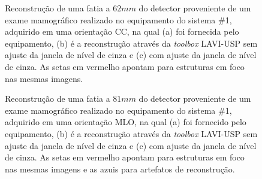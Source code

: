 \begin{figure}[!ht]
	\centering	
	\caption{Reconstrução de uma fatia a $62mm$ do detector proveniente de um exame mamográfico realizado no equipamento do sistema \#1, adquirido em uma orientação \acs{CC}, na qual (a) foi fornecida pelo equipamento, (b) é a reconstrução através da \textit{toolbox} LAVI-USP sem ajuste da janela de nível de cinza e (c) com ajuste da janela de nível de cinza. As setas em vermelho apontam para estruturas em foco nas mesmas imagens. }
	
	
	
	\hfil
	\label{fig:imgCap6ClinicalGECC}
\end{figure}

\clearpage

\begin{figure}[!ht]
	\centering	
	\caption{Reconstrução de uma fatia a $81mm$ do detector proveniente de um exame mamográfico realizado no equipamento do sistema \#1, adquirido em uma orientação \acs{MLO}, na qual (a) foi fornecido pelo equipamento, (b) é a reconstrução através da \textit{toolbox} LAVI-USP sem ajuste da janela de nível de cinza e (c) com ajuste da janela de nível de cinza. As setas em vermelho apontam para estruturas em foco nas mesmas imagens e as azuis para artefatos de reconstrução. }
		
	
	\hfil
	\label{fig:imgCap6ClinicalGEMLO}
\end{figure}

